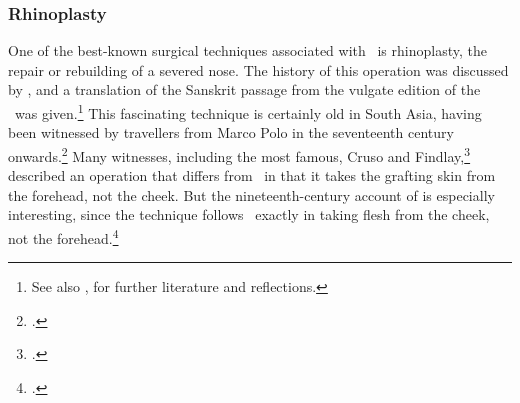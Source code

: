 

\subsubsection{Rhinoplasty}
\label{sec:rhinoplasty}

One of the best-known surgical techniques associated with \SS\ is rhinoplasty, the
repair or rebuilding of a severed nose. The history of this operation was
discussed by \citet[67--70, 99--100]{wuja-2003}, and a translation of the Sanskrit
passage from the vulgate edition of the \SS\ was given.\footnote{See also
\cite[IB, 327--328, note 186]{meul-hist}, for further literature and reflections.} 
This fascinating technique is certainly old in South Asia, having been witnessed
by travellers from Marco Polo in the seventeenth century
onwards.\footcite[ii.301]{manu-stor} Many witnesses, including the most famous,
Cruso and Findlay,\footcite[883, 891\,f.]{cowasjee} described an operation that
differs from \SS\ in that it takes the grafting skin from the forehead, not the
cheek.  But the nineteenth-century account of \citeauthor{thor-bann} is especially
interesting, since the technique follows \SS\ exactly in taking flesh from the
cheek, not the forehead.\footcite[352--3]{thor-bann}

